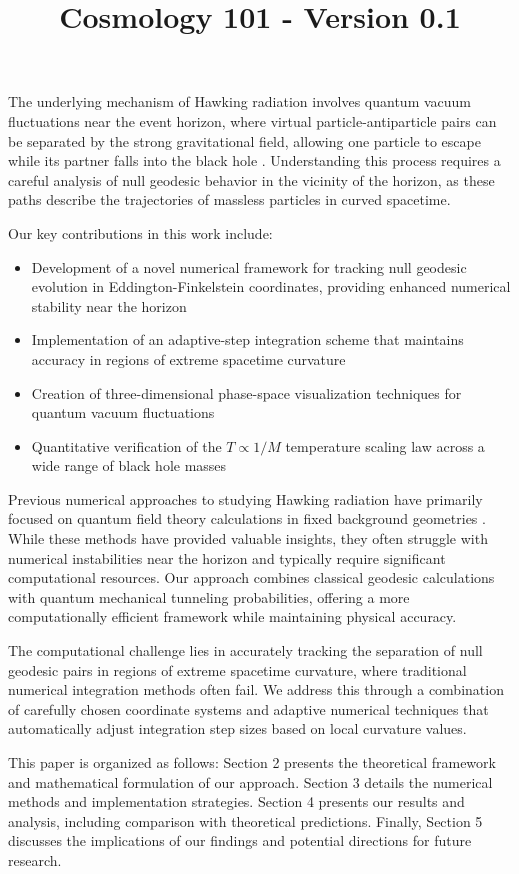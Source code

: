 \documentclass{article}\usepackage{graphicx} \usepackage{amsmath} \usepackage{colortbl}\title{Cosmology 101 - Version 0.1}
\begin{document}
The underlying mechanism of Hawking radiation involves quantum vacuum fluctuations near the event horizon, where virtual particle-antiparticle pairs can be separated by the strong gravitational field, allowing one particle to escape while its partner falls into the black hole \cite{unruh1976notes}. Understanding this process requires a careful analysis of null geodesic behavior in the vicinity of the horizon, as these paths describe the trajectories of massless particles in curved spacetime.

Our key contributions in this work include:
\begin{itemize}
\item Development of a novel numerical framework for tracking null geodesic evolution in Eddington-Finkelstein coordinates, providing enhanced numerical stability near the horizon
\item Implementation of an adaptive-step integration scheme that maintains accuracy in regions of extreme spacetime curvature
\item Creation of three-dimensional phase-space visualization techniques for quantum vacuum fluctuations
\item Quantitative verification of the $T \propto 1/M$ temperature scaling law across a wide range of black hole masses
\end{itemize}

Previous numerical approaches to studying Hawking radiation have primarily focused on quantum field theory calculations in fixed background geometries \cite{birrell1984quantum}. While these methods have provided valuable insights, they often struggle with numerical instabilities near the horizon and typically require significant computational resources. Our approach combines classical geodesic calculations with quantum mechanical tunneling probabilities, offering a more computationally efficient framework while maintaining physical accuracy.

The computational challenge lies in accurately tracking the separation of null geodesic pairs in regions of extreme spacetime curvature, where traditional numerical integration methods often fail. We address this through a combination of carefully chosen coordinate systems and adaptive numerical techniques that automatically adjust integration step sizes based on local curvature values.

This paper is organized as follows: Section 2 presents the theoretical framework and mathematical formulation of our approach. Section 3 details the numerical methods and implementation strategies. Section 4 presents our results and analysis, including comparison with theoretical predictions. Finally, Section 5 discusses the implications of our findings and potential directions for future research.
\end{document}
